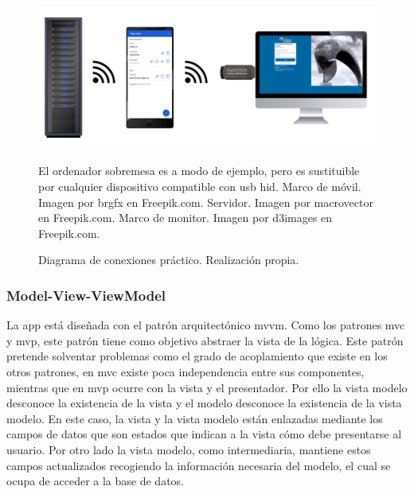 \begin{figure}[H]
    \centering
    \includegraphics[width=\textwidth]{gfx/diagrama_real.png}
    \caption{Diagrama de conexiones práctico. Realización propia.}
    \label{fig:diagrama_real}
    El ordenador sobremesa es a modo de ejemplo, pero es sustituible por cualquier dispositivo compatible con \gls{usb} \gls{hid}.\newline
    Marco de móvil. Imagen por brgfx en Freepik.com.\newline
    Servidor. Imagen por macrovector en Freepik.com.\newline
    Marco de monitor. Imagen por d3images en Freepik.com.\newline
\end{figure}


\subsubsection{Model-View-ViewModel}

La app está diseñada con el patrón arquitectónico \gls{mvvm}. Como los patrones \gls{mvc} y \gls{mvp}, este patrón tiene como objetivo abstraer la vista de la lógica.
Este patrón pretende solventar problemas como el grado de acoplamiento que existe en los otros patrones, en \gls{mvc} existe poca independencia entre sus componentes, mientras que en \gls{mvp} ocurre con la vista y el presentador.
Por ello la vista modelo desconoce la existencia de la vista y el modelo desconoce la existencia de la vista modelo.
En este caso, la vista y la vista modelo están enlazadas mediante los campos de datos que son estados que indican a la vista cómo debe presentarse al usuario.
Por otro lado la vista modelo, como intermediaria, mantiene estos campos actualizados recogiendo la información necesaria del modelo, el cual se ocupa de acceder a la base de datos.\cite{García2023mvvm}\cite{Kouraklis2016}

